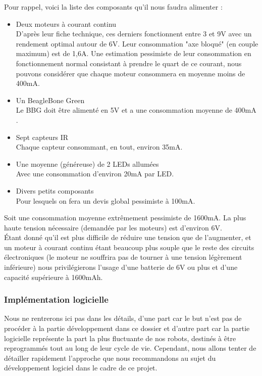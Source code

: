 			Pour rappel, voici la liste des composants qu'il nous faudra alimenter :
			\begin{itemize}
				\item Deux moteurs à courant continu\\
				D'après leur fiche technique\cite{bib8}, ces derniers fonctionnent entre 3 et 9V avec un rendement optimal autour de 6V. Leur consommation "axe bloqué" (en couple maximum) est de 1,6A. Une estimation pessimiste de leur consommation en fonctionnement normal consistant à prendre le quart de ce courant, nous pouvons considérer que chaque moteur consommera en moyenne moins de 400mA.
				\item Un BeagleBone Green\\
				Le BBG doit être alimenté en 5V et a une consommation moyenne de 400mA \cite{bib13}.
				\item Sept capteurs IR\\
				Chaque capteur consommant, en tout, environ 35mA.
				\item Une moyenne (généreuse) de 2 LEDs allumées\\
				Avec une consommation d'environ 20mA par LED.
				\item Divers petits composants\\
				Pour lesquels on fera un devis global pessimiste à 100mA.
			\end{itemize}

			Soit une consommation moyenne extrêmement pessimiste de 1600mA.
			La plus haute tension nécessaire (demandée par les moteurs) est d'environ 6V.\\

			Étant donné qu'il est plus difficile de réduire une tension que de l'augmenter, et un moteur à courant continu étant beaucoup plus souple que le reste des circuits électroniques (le moteur ne souffrira pas de tourner à une tension légèrement inférieure) nous privilégierons l'usage d'une batterie de 6V ou plus et d'une capacité supérieure à 1600mAh.


	\subsubsection{Implémentation logicielle}

		Nous ne rentrerons ici pas dans les détails, d'une part car le but n'est pas de procéder à la partie développement dans ce dossier et d'autre part car la partie logicielle représente la part la plus fluctuante de nos robots, destinés à être reprogrammés tout au long de leur cycle de vie. Cependant, nous allons tenter de détailler rapidement l'approche que nous recommandons au sujet du développement logiciel dans le cadre de ce projet.

